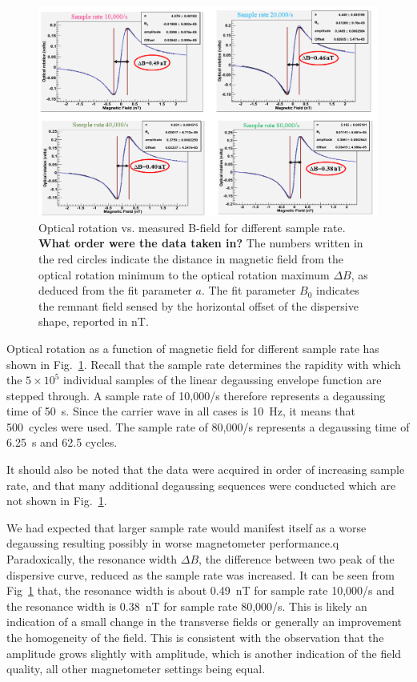\begin{figure}%
  \centering\includegraphics[width=\linewidth]{figures/sample_rate}
  \caption{ Optical rotation vs. measured B-field for different sample
    rate.  {\bf What order were the data taken in?%
    }  The numbers
    written in the red circles indicate the distance in magnetic field
    from the optical rotation minimum to the optical rotation maximum
    $\Delta B$, as deduced from the fit parameter $a$.  The fit
    parameter $B_0$ indicates the remnant field sensed by the
    horizontal offset of the dispersive shape, reported in
    nT.\label{fig:different-sample-rate}}
\end{figure}

Optical rotation as a function of magnetic field for different sample
rate has shown in Fig.~\ref{fig:different-sample-rate}.  Recall that
the sample rate determines the rapidity with which the $5\times 10^5$
individual samples of the linear degaussing envelope function are
stepped through.  A sample rate of 10,000/s therefore represents a
degaussing time of 50~s.  Since the carrier wave in all cases is
10~Hz, it means that 500~cycles were used.  The sample rate of
80,000/s represents a degaussing time of 6.25~s and 62.5 cycles.

It should also be noted that the data were acquired in order of
increasing sample rate, and that many additional degaussing sequences
were conducted which are not shown in
Fig.~\ref{fig:different-sample-rate}.

We had expected that larger sample rate would manifest itself as a
worse degaussing resulting possibly in worse magnetometer performance.q
Paradoxically, the resonance width $\Delta B$, the difference between
two peak of the dispersive curve, reduced as the sample rate was
increased.  It can be seen from Fig~\ref{fig:different-sample-rate}
that, the resonance width is about 0.49~nT for sample rate 10,000/s
and the resonance width is 0.38~nT for sample rate 80,000/s.  This is
likely an indication of a small change in the transverse fields or
generally an improvement the homogeneity of the field.  This is
consistent with the observation that the amplitude grows slightly with
amplitude, which is another indication of the field quality, all other
magnetometer settings being equal.

